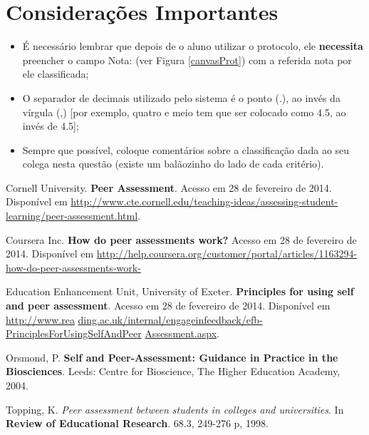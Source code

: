 \documentclass[12pt,a4paper,oneside]{article}
\begin{document}
\section{Considerações Importantes} \label{cons}

\begin{itemize}
	\item É necessário lembrar que depois de o aluno utilizar o protocolo, ele {\bf necessita} preencher o campo {\sf Nota:} (ver Figura \ref{canvasProt}) com a referida nota por ele classificada;
	\item O separador de decimais utilizado pelo sistema é o ponto (.), ao invés da vírgula (,) [por exemplo, quatro e meio tem que ser colocado como 4.5, ao invés de 4.5];
	\item Sempre que possível, coloque comentários sobre a classificação dada ao seu colega nesta questão (existe um balãozinho do lado de cada critério).
\end{itemize}

\begin{thebibliography}{9}

\footnotesize

 Cornell University. {\bf Peer Assessment}. Acesso em 28 de fevereiro de 2014. Disponível em \url{http://www.cte.cornell.edu/teaching-ideas/assessing-student-} \url{learning/peer-assessment.html}.

 Coursera Inc. {\bf How do peer assessments work?} Acesso em 28 de fevereiro de 2014. Disponível em \url{http://help.coursera.org/customer/portal/articles/1163294-how-do-peer-assessments-work-}

 Education Enhancement Unit, University of Exeter. {\bf Principles for using self and peer assessment}. Acesso em 28 de fevereiro de 2014. Disponível em \url{http://www.rea} \url{ding.ac.uk/internal/engageinfeedback/efb-PrinciplesForUsingSelfAndPeer} \url{Assessment.aspx}.

 Orsmond, P. {\bf Self and Peer-Assessment: Guidance in Practice in the Biosciences}. Leeds: Centre for
Bioscience, The Higher Education Academy, 2004.

 Topping, K. {\it Peer assessment between students in colleges and universities}. In {\bf Review of Educational Research}. 68.3, 249-276 p, 1998.

\end{thebibliography}
\end{document}
